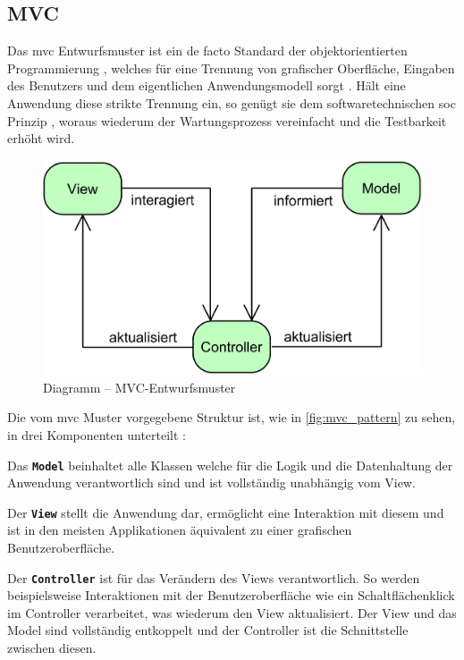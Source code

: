 \subsection{MVC}
Das \ac{mvc} Entwurfsmuster ist ein de facto Standard der objektorientierten Programmierung \cite{Deacon1995}, welches für eine Trennung von grafischer Oberfläche, Eingaben des Benutzers und dem eigentlichen Anwendungsmodell sorgt \cite{Burbeck1992}. Hält eine Anwendung diese strikte Trennung ein, so genügt sie dem softwaretechnischen \ac{soc} Prinzip \cite{Grant2014}, woraus wiederum der Wartungsprozess vereinfacht und die Testbarkeit erhöht wird.
\begin{figure}[H]
	\centering
	\includegraphics[width=\textwidth-2cm]{Abbildungen/MVC Pattern.png}
	\caption{Diagramm -- MVC-Entwurfsmuster}
	\label{fig:mvc_pattern}
\end{figure}
\noindent Die vom \ac{mvc} Muster vorgegebene Struktur ist, wie in \autoref{fig:mvc_pattern} zu sehen, in drei Komponenten unterteilt \cite{Deacon1995}:
\begin{description}
	\item Das \texttt{\textbf{Model}} beinhaltet alle Klassen welche für die Logik und die Datenhaltung der Anwendung verantwortlich sind und ist vollständig unabhängig vom View.
	\item Der \texttt{\textbf{View}} stellt die Anwendung dar, ermöglicht eine Interaktion mit diesem und ist in den meisten Applikationen äquivalent zu einer grafischen Benutzeroberfläche.
	\item Der \texttt{\textbf{Controller}} ist für das Verändern des Views verantwortlich. So werden beispielsweise Interaktionen mit der Benutzeroberfläche wie ein Schaltflächenklick im Controller verarbeitet, was wiederum den View aktualisiert. Der View und das Model sind vollständig entkoppelt und der Controller ist die Schnittstelle zwischen diesen.
\end{description}
